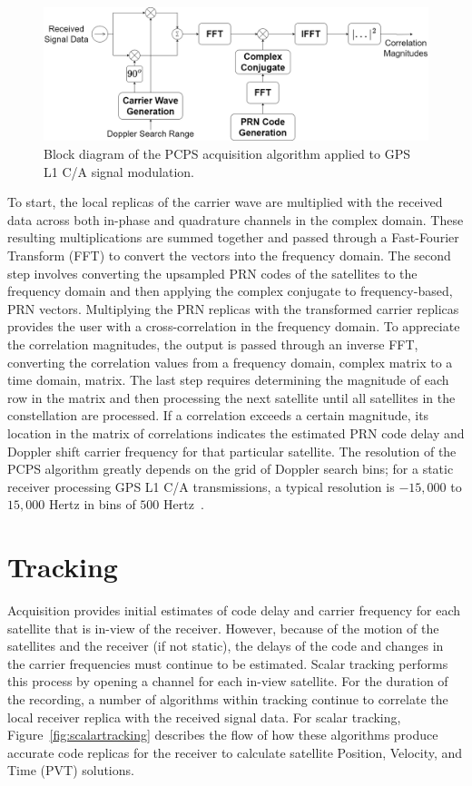 \begin{figure}[!ht]
    \centering
    \includegraphics[width=\linewidth]{Figures/PCPS.drawio.png}
    \caption{Block diagram of the PCPS acquisition algorithm applied to GPS L1 C/A signal modulation.}\label{fig:PCPS}
\end{figure}

To start, the local replicas of the carrier wave are multiplied with the received data across both in-phase and quadrature channels in the complex domain. These resulting multiplications are summed together and passed through a Fast-Fourier Transform (FFT) to convert the vectors into the frequency domain. The second step involves converting the upsampled PRN codes of the satellites to the frequency domain and then applying the complex conjugate to frequency-based, PRN vectors. Multiplying the PRN replicas with the transformed carrier replicas provides the user with a cross-correlation in the frequency domain. To appreciate the correlation magnitudes, the output is passed through an inverse FFT, converting the correlation values from a frequency domain, complex matrix to a time domain, matrix. The last step requires determining the magnitude of each row in the matrix and then processing the next satellite until all satellites in the constellation are processed. If a correlation exceeds a certain magnitude, its location in the matrix of correlations indicates the estimated PRN code delay and Doppler shift carrier frequency for that particular satellite. The resolution of the PCPS algorithm greatly depends on the grid of Doppler search bins; for a static receiver processing GPS L1 C/A transmissions, a typical resolution is \(-15,000\) to \(15,000\) Hertz in bins of \(500\) Hertz~\cite{scottRapidSignalAcquisition2001}.

\section{\textbf{Tracking}}
Acquisition provides initial estimates of code delay and carrier frequency for each satellite that is in-view of the receiver. However, because of the motion of the satellites and the receiver (if not static), the delays of the code and changes in the carrier frequencies must continue to be estimated. Scalar tracking performs this process by opening a channel for each in-view satellite. For the duration of the recording, a number of algorithms within tracking continue to correlate the local receiver replica with the received signal data. For scalar tracking, Figure~\ref{fig:scalartracking} describes the flow of how these algorithms produce accurate code replicas for the receiver to calculate satellite Position, Velocity, and Time (PVT) solutions.

